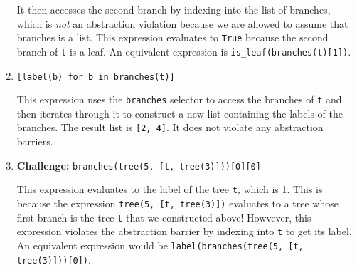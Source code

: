 \begin{enumerate}
\begin{solution}[0.20in]
It then accesses the second branch by indexing into the list of branches, which
is \emph{not} an abstraction violation because we are allowed to assume that
branches is a list.  This expression evaluates to \texttt{True} because the
second branch of \texttt{t} is a leaf. An equivalent expression is
\texttt{is\_leaf(branches(t)[1])}.
\end{solution}
\item \texttt{[label(b) for b in branches(t)]}
\begin{solution}[0.20in]
This expression uses the \texttt{branches} selector to access the branches of
\texttt{t} and then iterates through it to construct a new list containing the
labels of the branches. The result list is \texttt{[2, 4]}. It does not violate
any abstraction barriers.
\end{solution}
\item \textbf{Challenge:} \texttt{branches(tree(5, [t, tree(3)]))[0][0]}
\begin{solution}[0.20in]
This expression evaluates to the label of the tree \texttt{t}, which is 1. This
is because the expression \texttt{tree(5, [t, tree(3)])} evaluates to a tree
whose first branch is the tree \texttt{t} that we constructed above! Howvever,
this expression violates the abstraction barrier by indexing into \texttt{t} to
get its label. An equivalent expression would be \texttt{label(branches(tree(5,
[t, tree(3)]))[0])}.
\end{solution}
\end{enumerate}
